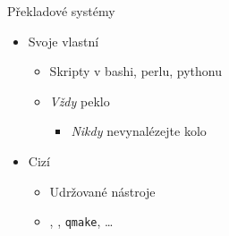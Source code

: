 \begin{frame}{Překladové systémy}

  \begin{itemize}

    \item Svoje vlastní
    \begin{itemize}
      \item Skripty v bashi, perlu, pythonu

      \pause

      \item \emph{Vždy} peklo

      \pause

      \begin{itemize}
	\item \emph{Nikdy} nevynalézejte kolo
      \end{itemize}
    \end{itemize}

    \pause

    \item Cizí
    \begin{itemize}
      \item Udržované nástroje

      \pause

      \item \make, \cmake, \texttt{qmake}, \dots
    \end{itemize}

  \end{itemize}

\end{frame}

